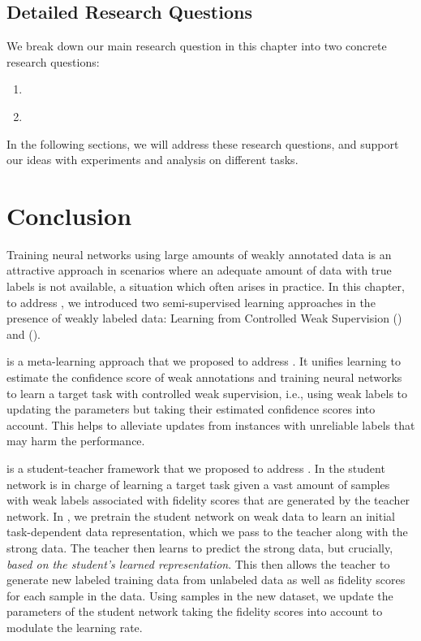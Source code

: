 \subsection{Detailed Research Questions}
We break down our main research question in this chapter into two concrete research questions:
\begin{resqbox}
\begin{enumerate}
\item[\textbf{\resqname{c5.1}}] \emph{}
\item[\textbf{\resqname{c5.2}}] \emph{}
\end{enumerate}
\end{resqbox}
In the following sections, we will address these research questions, and support our ideas with experiments and analysis on different tasks.







\section{Conclusion}
Training neural networks using large amounts of weakly annotated data is an attractive approach in scenarios where an adequate amount of data with true labels is not available, a situation which often arises in practice.
%
In this chapter, to address \textbf{}, we introduced two semi-supervised learning approaches in the presence of weakly labeled data: Learning from Controlled Weak Supervision (\cws) and \fwlfulllc (\fwl).

\cws is a meta-learning approach that we proposed to address \textbf{}. It unifies learning to estimate the confidence score of weak annotations and training neural networks to learn a target task with controlled weak supervision, i.e., using weak labels to updating the parameters but taking their estimated confidence scores into account. This helps to alleviate updates from instances with unreliable labels that may harm the performance.

\fwl is a student-teacher framework that we proposed to address \textbf{}. In \fwl the student network is in charge of learning a target task given a vast amount of samples with weak labels associated with fidelity scores that are generated by the teacher network. In \fwl, we pretrain the student network on weak data to learn an initial task-dependent data representation, which we pass to the teacher along with the strong data. The teacher then learns to predict the strong data, but crucially, \emph{based on the student's learned representation}. This then allows the teacher to generate new labeled training data from unlabeled data as well as fidelity scores for each sample in the data. Using samples in the new dataset, we update the parameters of the student network taking the fidelity scores into account to modulate the learning rate. 

